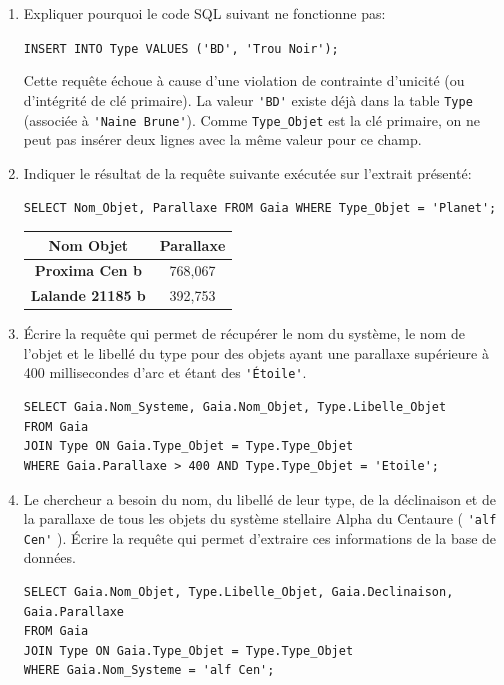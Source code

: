 \begin{enumerate}[resume=monDS]
    \item Expliquer pourquoi le code SQL suivant ne fonctionne pas: 
    
    \verb|INSERT INTO Type VALUES ('BD', 'Trou Noir');|
    \begin{blocvisible}[height=2.]
Cette requête échoue à cause d'une violation de contrainte d'unicité (ou d'intégrité de clé primaire). La valeur \verb|'BD'| existe déjà dans la table \verb|Type| (associée à \verb|'Naine Brune'|). Comme \verb|Type_Objet| est la clé primaire, on ne peut pas insérer deux lignes avec la même valeur pour ce champ.
    \end{blocvisible}

    \item Indiquer le résultat de la requête suivante exécutée sur l'extrait présenté: 
    
    \verb|SELECT Nom_Objet, Parallaxe FROM Gaia WHERE Type_Objet = 'Planet';|   

\begin{blocvisible}[height=2.]
\begin{center}
\begin{tabular}{|c|c|}
\hline
\textbf{Nom Objet} & \textbf{Parallaxe} \\
\hline
\textbf{Proxima Cen b} & 768,067 \\
\hline
\textbf{Lalande 21185 b} & 392,753 \\
\hline  
\end{tabular}
\end{center}

\end{blocvisible}

\item Écrire la requête qui permet de récupérer le nom du système, le nom de l’objet et le libellé du type pour des objets ayant une parallaxe supérieure à 400 millisecondes d’arc et étant des \verb|'Étoile'|.

    \begin{blocvisible}[height=2.5]
\begin{verbatim}
SELECT Gaia.Nom_Systeme, Gaia.Nom_Objet, Type.Libelle_Objet 
FROM Gaia 
JOIN Type ON Gaia.Type_Objet = Type.Type_Objet
WHERE Gaia.Parallaxe > 400 AND Type.Type_Objet = 'Etoile';
\end{verbatim}

    \end{blocvisible}
\item Le chercheur a besoin du nom, du libellé de leur type, de la déclinaison et de la parallaxe de tous les objets du système stellaire Alpha du Centaure ( \verb|'alf Cen'| ). Écrire la requête qui permet d’extraire ces informations de la base de données.

    \begin{blocvisible}[height=2.5]
\begin{verbatim}
SELECT Gaia.Nom_Objet, Type.Libelle_Objet, Gaia.Declinaison, Gaia.Parallaxe 
FROM Gaia 
JOIN Type ON Gaia.Type_Objet = Type.Type_Objet
WHERE Gaia.Nom_Systeme = 'alf Cen';
\end{verbatim}

    \end{blocvisible}
\end{enumerate}
